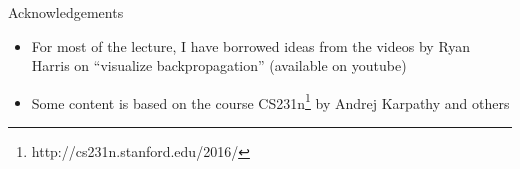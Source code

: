 \begin{frame}
	\begin{block}{Acknowledgements}
		\begin{itemize}\justifying
			\item For most of the lecture, I have borrowed ideas from the videos by Ryan Harris on ``visualize backpropagation'' (available on youtube)
			\item Some content is based on the course CS231n\footnote{http://cs231n.stanford.edu/2016/} by Andrej Karpathy and others
		\end{itemize}
	\end{block}
\end{frame}
